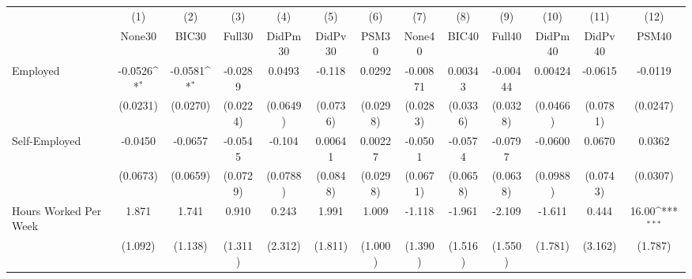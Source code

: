 {
\def\sym#1{\ifmmode^{#1}\else\(^{#1}\)\fi}
\begin{tabular}{l*{12}{c}}
\toprule
            &\multicolumn{1}{c}{(1)}&\multicolumn{1}{c}{(2)}&\multicolumn{1}{c}{(3)}&\multicolumn{1}{c}{(4)}&\multicolumn{1}{c}{(5)}&\multicolumn{1}{c}{(6)}&\multicolumn{1}{c}{(7)}&\multicolumn{1}{c}{(8)}&\multicolumn{1}{c}{(9)}&\multicolumn{1}{c}{(10)}&\multicolumn{1}{c}{(11)}&\multicolumn{1}{c}{(12)}\\
            &\multicolumn{1}{c}{None30}&\multicolumn{1}{c}{BIC30}&\multicolumn{1}{c}{Full30}&\multicolumn{1}{c}{DidPm30}&\multicolumn{1}{c}{DidPv30}&\multicolumn{1}{c}{PSM30}&\multicolumn{1}{c}{None40}&\multicolumn{1}{c}{BIC40}&\multicolumn{1}{c}{Full40}&\multicolumn{1}{c}{DidPm40}&\multicolumn{1}{c}{DidPv40}&\multicolumn{1}{c}{PSM40}\\
\midrule
Employed    &     -0.0526\sym{*}  &     -0.0581\sym{*}  &     -0.0289         &      0.0493         &      -0.118         &      0.0292         &    -0.00871         &     0.00343         &    -0.00444         &     0.00424         &     -0.0615         &     -0.0119         \\
            &    (0.0231)         &    (0.0270)         &    (0.0224)         &    (0.0649)         &    (0.0736)         &    (0.0298)         &    (0.0283)         &    (0.0336)         &    (0.0328)         &    (0.0466)         &    (0.0781)         &    (0.0247)         \\
\addlinespace
Self-Employed&     -0.0450         &     -0.0657         &     -0.0545         &      -0.104         &     0.00641         &     0.00227         &     -0.0501         &     -0.0574         &     -0.0797         &     -0.0600         &      0.0670         &      0.0362         \\
            &    (0.0673)         &    (0.0659)         &    (0.0729)         &    (0.0788)         &    (0.0848)         &    (0.0298)         &    (0.0671)         &    (0.0658)         &    (0.0638)         &    (0.0988)         &    (0.0743)         &    (0.0307)         \\
\addlinespace
Hours Worked Per Week&       1.871         &       1.741         &       0.910         &       0.243         &       1.991         &       1.009         &      -1.118         &      -1.961         &      -2.109         &      -1.611         &       0.444         &       16.00\sym{***}\\
            &     (1.092)         &     (1.138)         &     (1.311)         &     (2.312)         &     (1.811)         &     (1.000)         &     (1.390)         &     (1.516)         &     (1.550)         &     (1.781)         &     (3.162)         &     (1.787)         \\

\end{tabular}}
